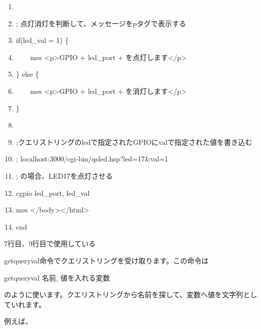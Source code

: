 \documentclass[a4paper,12pt,dvipdfmx]{jarticle}
\begin{document}
\begin{boxedminipage}{16.538cm}
\begin{enumerate}
	\item

	\item; 点灯消灯を判断して、メッセージをpタグで表示する

	\item if(led\_val = 1) \{

	\item\ \ \ \ mes {\textquotedbl}{\textless}p{\textgreater}GPIO{\textquotedbl} + led\_port +
		{\textquotedbl}を点灯します{\textless}/p{\textgreater}{\textquotedbl}

	\item\} else \{

	\item\ \ \ \ mes {\textquotedbl}{\textless}p{\textgreater}GPIO{\textquotedbl} + led\_port +
		{\textquotedbl}を消灯します{\textless}/p{\textgreater}{\textquotedbl}

	\item\}


	\item

	\item;クエリストリングのledで指定されたGPIOにvalで指定された値を書き込む

	\item; localhost:3000/cgi-bin/qsled.hsp?led=17\&val=1

	\item; の場合、LED17を点灯させる

	\item cgpio led\_port, led\_val

	\item mes {\textquotedbl}{\textless}/body{\textgreater}{\textless}/html{\textgreater}{\textquotedbl}

	\item end
	\end{enumerate}
\end{boxedminipage}
\flushleft

\bigskip



\bigskip


\bigskip

7行目、9行目で使用している

getqueryval命令でクエリストリングを受け取ります。この命令は

getqueryval 名前, 値を入れる変数

のように使います。クエリストリングから名前を探して、変数へ値を文字列としていれます。

例えば、
\end{document}

